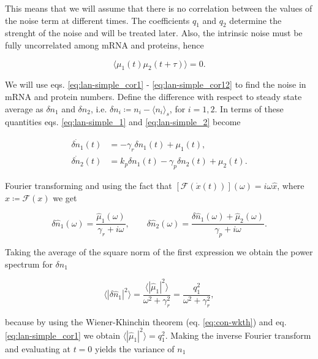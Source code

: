 This means that we will assume that there is no correlation between the values of the noise term at different times. The coefficients $q_1$ and $q_2$ determine the strenght of the noise and will be treated later. Also, the intrinsic noise must be fully uncorrelated among mRNA and proteins, hence

\begin{equation}
  \langle\mu_1(t)\mu_2(t+\tau)\rangle = 0. \label{eq:lan-simple_cor12}
\end{equation}

We will use eqs. \eqref{eq:lan-simple_cor1} - \eqref{eq:lan-simple_cor12} to find the noise in mRNA and protein numbers. Define the difference with respect to steady state average as $\delta n_1$ and $\delta n_2$, i.e. $\delta n_i \coloneqq n_i - \langle n_i\rangle_s$, for $i=1,2$. In terms of these quantities eqs. \eqref{eq:lan-simple_1} and \eqref{eq:lan-simple_2} become

\begin{align}
  \dot{\delta n_1}(t) &= -\gamma_r\delta n_1(t) + \mu_1(t)\label{eq:lan-simple_d1},\\
  \dot{\delta n_2}(t) &= k_p\delta n_1(t) -\gamma_p\delta n_2(t) + \mu_2(t)\label{eq:lan-simple_d2}.
\end{align}

Fourier transforming and using the fact that $\left[\mathscr{F}(\dot{x}(t))\right](\omega) = i\omega \hat{x}$, where $\hat{x}\coloneqq\mathscr{F}(x)$ we get 

\begin{equation}
  \label{eq:lan-nfourier}
  \delta\hat{n}_1(\omega) = \frac{\hat{\mu}_1(\omega)}{\gamma_r+i\omega},\quad\quad \delta\hat{n}_2(\omega) = \frac{\delta\hat{n}_1(\omega) + \hat{\mu}_2(\omega)}{\gamma_p+i\omega}.
\end{equation}

Taking the average of the square norm of the first expression we obtain the power spectrum for $\delta n_1$

\begin{equation}
  \label{eq:lan-simple_psd1}
  \langle|\delta\hat{n}_1|^2\rangle = \frac{\langle|\hat{\mu}_1|^2\rangle}{\omega^2+\gamma_r^2} = \frac{q_1^2}{\omega^2+\gamma_r^2},
\end{equation}

because by using the Wiener-Khinchin theorem (eq. \eqref{eq:con-wkth}) and eq. \eqref{eq:lan-simple_cor1} we obtain $\langle|\hat{\mu}_1|^2\rangle = q_1^2$. Making the inverse Fourier transform and evaluating at $t=0$ yields the variance of $n_1$


